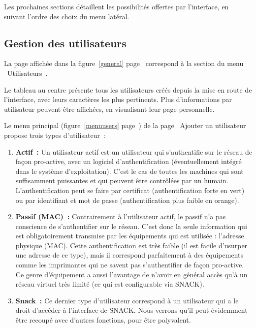 Les prochaines sections détaillent les possibilités offertes par l'interface, en suivant l'ordre des choix du menu latéral.

\subsection{Gestion des utilisateurs}

La page affichée dans la figure~\ref{general} page~\pageref{general} correspond à la section du menu \og~Utilisateurs~\fg.

Le tableau au centre présente tous les utilisateurs créés depuis la mise en route de l'interface, avec leurs caractères les plus pertinents. Plus d'informations par utilisateur peuvent être affichées, en visualisant leur page personnelle.

Le menu principal (figure~\ref{menuusers} page~\pageref{menuusers}) de la page \og~Ajouter un utilisateur~\fg{} propose trois types d'utilisateur~:

\begin{enumerate}
\item \textbf{Actif~:} Un utilisateur actif est un utilisateur qui s'authentifie sur le réseau de façon pro-active, avec un logiciel d'authentification (éventuellement intégré dans le système d'exploitation). C'est le cas de toutes les machines qui sont suffisamment puissantes et qui peuvent être contrôlées par un humain. L'authentification peut se faire par certificat (authentification forte en vert) ou par identifiant et mot de passe (authentification plus faible en orange).
\item \textbf{Passif (MAC)~:} Contrairement à l'utilisateur actif, le passif n'a pas conscience de s'authentifier sur le réseau. C'est donc la seule information qui est obligatoirement transmise par les équipements qui est utilisée : l'adresse physique (MAC). Cette authentification est très faible (il est facile d'usurper une adresse de ce type), mais il correspond parfaitement à des équipements comme les imprimantes qui ne savent pas s'authentifier de façon pro-active. Ce genre d'équipement a aussi l'avantage de n'avoir en général accès qu'à un réseau virtuel très limité (ce qui est configurable via SNACK).
\item \textbf{Snack~:} Ce dernier type d'utilisateur correspond à un utilisateur qui a le droit d'accéder à l'interface de SNACK. Nous verrons qu'il peut évidemment être recoupé avec d'autres fonctions, pour être polyvalent.
\end{enumerate}

